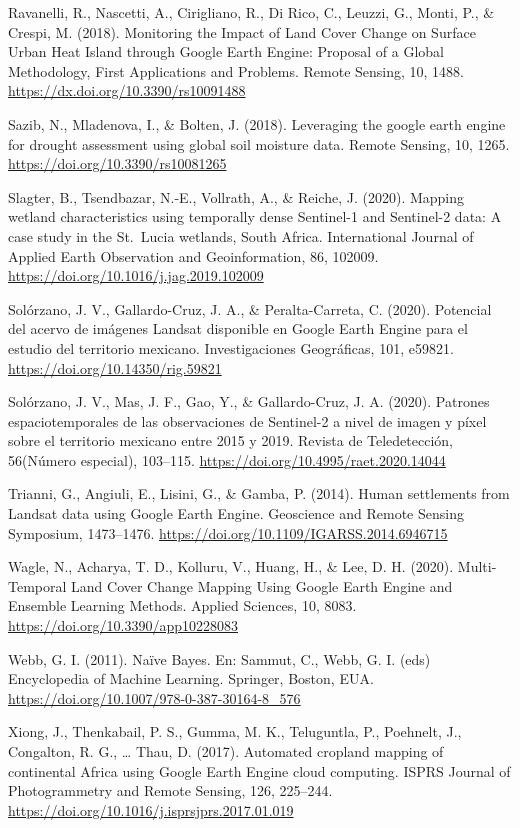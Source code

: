 \documentclass[
  12pt,
  letterpaper,
  twoside]{book}
\begin{document}
Ravanelli, R., Nascetti, A., Cirigliano, R., Di Rico, C., Leuzzi, G., Monti, P., \& Crespi, M. (2018). Monitoring the Impact of Land Cover Change on Surface Urban Heat Island through Google Earth Engine: Proposal of a Global Methodology, First Applications and Problems. Remote Sensing, 10, 1488. \url{https://dx.doi.org/10.3390/rs10091488}

Sazib, N., Mladenova, I., \& Bolten, J. (2018). Leveraging the google earth engine for drought assessment using global soil moisture data. Remote Sensing, 10, 1265. \url{https://doi.org/10.3390/rs10081265}

Slagter, B., Tsendbazar, N.-E., Vollrath, A., \& Reiche, J. (2020). Mapping wetland characteristics using temporally dense Sentinel-1 and Sentinel-2 data: A case study in the St.~Lucia wetlands, South Africa. International Journal of Applied Earth Observation and Geoinformation, 86, 102009. \url{https://doi.org/10.1016/j.jag.2019.102009}

Solórzano, J. V., Gallardo-Cruz, J. A., \& Peralta-Carreta, C. (2020). Potencial del acervo de imágenes Landsat disponible en Google Earth Engine para el estudio del territorio mexicano. Investigaciones Geográficas, 101, e59821. \url{https://doi.org/10.14350/rig.59821}

Solórzano, J. V., Mas, J. F., Gao, Y., \& Gallardo-Cruz, J. A. (2020). Patrones espaciotemporales de las observaciones de Sentinel-2 a nivel de imagen y píxel sobre el territorio mexicano entre 2015 y 2019. Revista de Teledetección, 56(Número especial), 103--115. \url{https://doi.org/10.4995/raet.2020.14044}

Trianni, G., Angiuli, E., Lisini, G., \& Gamba, P. (2014). Human settlements from Landsat data using Google Earth Engine. Geoscience and Remote Sensing Symposium, 1473--1476. \url{https://doi.org/10.1109/IGARSS.2014.6946715}

Wagle, N., Acharya, T. D., Kolluru, V., Huang, H., \& Lee, D. H. (2020). Multi-Temporal Land Cover Change Mapping Using Google Earth Engine and Ensemble Learning Methods. Applied Sciences, 10, 8083. \url{https://doi.org/10.3390/app10228083}

Webb, G. I. (2011). Naïve Bayes. En: Sammut, C., Webb, G. I. (eds) Encyclopedia of Machine Learning. Springer, Boston, EUA. \url{https://doi.org/10.1007/978-0-387-30164-8_576}

Xiong, J., Thenkabail, P. S., Gumma, M. K., Teluguntla, P., Poehnelt, J., Congalton, R. G., \ldots{} Thau, D. (2017). Automated cropland mapping of continental Africa using Google Earth Engine cloud computing. ISPRS Journal of Photogrammetry and Remote Sensing, 126, 225--244. \url{https://doi.org/10.1016/j.isprsjprs.2017.01.019}
\end{document}
